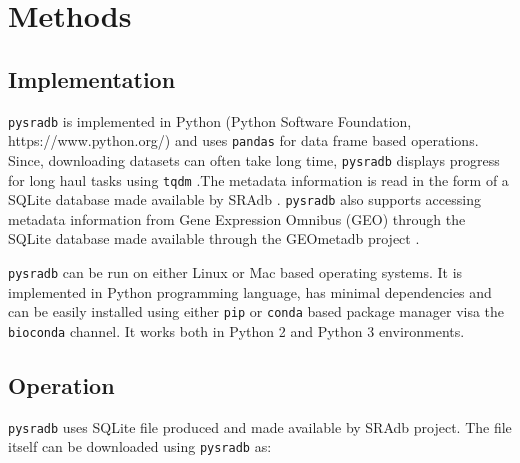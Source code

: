 \documentclass[9pt,a4paper]{extarticle}
\begin{document}
\section*{Methods}

\subsection*{Implementation}
\texttt{pysradb} is implemented in Python (Python Software Foundation, 
https://www.python.org/) \cite{vanRossum:2011:PLR:2011965} and uses
\texttt{pandas} \cite{mckinney-proc-scipy-2010} for data frame based operations. 
Since, downloading datasets can often take long time, \texttt{pysradb} displays 
progress for long haul tasks using \texttt{tqdm}
\cite{casper_da_costa_luis_2018_1211527}.The metadata information is read in the
form of a SQLite \cite{about_sqlite} database made available by SRAdb
\cite{zhu2013sradb}. \texttt{pysradb} also supports accessing metadata 
information from Gene Expression Omnibus (GEO) \cite{edgar2002gene,
barrett2012ncbi} through the SQLite database made available through the
GEOmetadb project \cite{zhu2008geometadb}.

\texttt{pysradb} can be run on either Linux or Mac based operating systems. It
is implemented in Python programming language, has minimal dependencies and can
be easily installed using either \texttt{pip} or \texttt{conda} based package
manager visa the \texttt{bioconda} \cite{gruning2018bioconda} channel. It works
both in Python 2 and Python 3 environments.


\subsection*{Operation}

\texttt{pysradb} uses SQLite file produced and made available by SRAdb 
\cite{zhu2013sradb} project. The file itself can be downloaded using
\texttt{pysradb} as:
\end{document}
